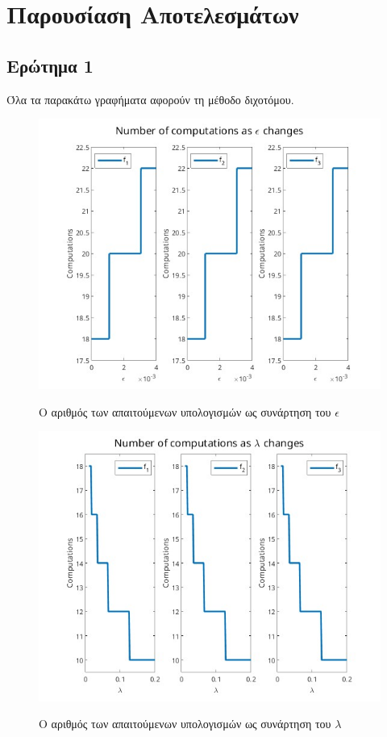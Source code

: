 \chapter{Παρουσίαση Αποτελεσμάτων}
\label{ch:chapter3}

\section{Ερώτημα 1}

Όλα τα παρακάτω γραφήματα αφορούν τη μέθοδο διχοτόμου.

\begin{figure}[H]
    \includegraphics[scale=0.7]{plots/ex1/e_comps.jpg}
    \label{fig:funcs}
    \caption{Ο αριθμός των απαιτούμενων υπολογισμών ως συνάρτηση του $\epsilon$}
    \centering
\end{figure} 

\begin{figure}[H]
    \includegraphics[scale=0.7]{plots/ex1/l_comps.jpg}
    \label{fig:funcs}
    \caption{Ο αριθμός των απαιτούμενων υπολογισμών ως συνάρτηση του $\lambda$}
    \centering
\end{figure}


